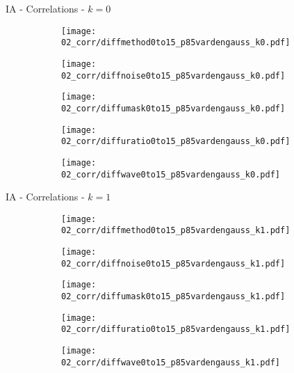 \documentclass{beamer}
\begin{document}
\begin{frame}{IA - Correlations - $k=0$}{}
\begin{figure}
\centering
\begin{subfigure}{0.19\textwidth}
\texttt{[image: 02\_corr/diffmethod0to15\_p85vardengauss\_k0.pdf]}
\end{subfigure}
\begin{subfigure}{0.19\textwidth}
\texttt{[image: 02\_corr/diffnoise0to15\_p85vardengauss\_k0.pdf]}
\end{subfigure}
\begin{subfigure}{0.19\textwidth}
\texttt{[image: 02\_corr/diffumask0to15\_p85vardengauss\_k0.pdf]}
\end{subfigure}
\begin{subfigure}{0.19\textwidth}
\texttt{[image: 02\_corr/diffuratio0to15\_p85vardengauss\_k0.pdf]}
\end{subfigure}
\begin{subfigure}{0.19\textwidth}
\texttt{[image: 02\_corr/diffwave0to15\_p85vardengauss\_k0.pdf]}
\end{subfigure}
\end{figure}
\end{frame}

\begin{frame}{IA - Correlations - $k=1$}{}
\begin{figure}
\centering
\begin{subfigure}{0.19\textwidth}
\texttt{[image: 02\_corr/diffmethod0to15\_p85vardengauss\_k1.pdf]}
\end{subfigure}
\begin{subfigure}{0.19\textwidth}
\texttt{[image: 02\_corr/diffnoise0to15\_p85vardengauss\_k1.pdf]}
\end{subfigure}
\begin{subfigure}{0.19\textwidth}
\texttt{[image: 02\_corr/diffumask0to15\_p85vardengauss\_k1.pdf]}
\end{subfigure}
\begin{subfigure}{0.19\textwidth}
\texttt{[image: 02\_corr/diffuratio0to15\_p85vardengauss\_k1.pdf]}
\end{subfigure}
\begin{subfigure}{0.19\textwidth}
\texttt{[image: 02\_corr/diffwave0to15\_p85vardengauss\_k1.pdf]}
\end{subfigure}
\end{figure}
\end{frame}
\end{document}
